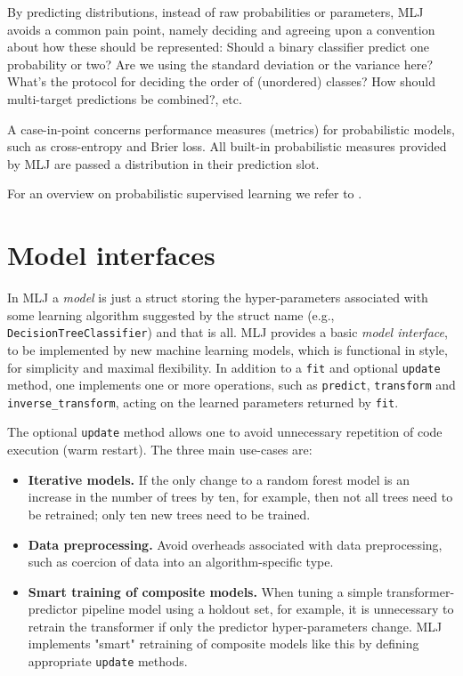 \documentclass{article}
\begin{document}
By predicting distributions, instead of raw probabilities or
parameters, MLJ avoids a common pain point, namely deciding and
agreeing upon a convention about how these should be represented:
Should a binary classifier predict one probability or two? Are we
using the standard deviation or the variance here? What's the protocol
for deciding the order of (unordered) classes? How should multi-target
predictions be combined?, etc.

A case-in-point concerns performance measures (metrics) for
probabilistic models, such as cross-entropy and Brier loss. All
built-in probabilistic measures provided by MLJ are passed a
distribution in their prediction slot.

For an overview on probabilistic supervised learning we refer to
\cite{Gressmann2018}.

\section{Model interfaces}

In MLJ a \textit{model} is just a struct storing the hyper-parameters
associated with some learning algorithm suggested by the struct name
(e.g., \texttt{DecisionTreeClassifier}) and that is all.  MLJ provides
a basic \textit{model interface}, to be implemented by new machine
learning models, which is functional in style, for simplicity and
maximal flexibility. In addition to a \texttt{fit} and optional
\texttt{update} method, one implements one or more operations, such as
\texttt{predict}, \texttt{transform} and \texttt{inverse\_transform},
acting on the learned parameters returned by \texttt{fit}.

The optional \texttt{update} method allows one to avoid unnecessary
repetition of code execution (warm restart). The three main use-cases
are:

\begin{itemize}

\item \textbf{Iterative models.} If the only change to a random forest
  model is an increase in the number of trees by ten, for example,
  then not all trees need to be retrained; only ten new trees need to
  be trained.

\item \textbf{Data preprocessing.} Avoid overheads associated with
  data preprocessing, such as coercion of data into an
  algorithm-specific type.

\item \textbf{Smart training of composite models.} When tuning a
  simple transformer-predictor pipeline model using a holdout set, for
  example, it is unnecessary to retrain the transformer if only the
  predictor hyper-parameters change. MLJ implements "smart" retraining
  of composite models like this by defining appropriate
  \texttt{update} methods.

\end{itemize}
\end{document}
